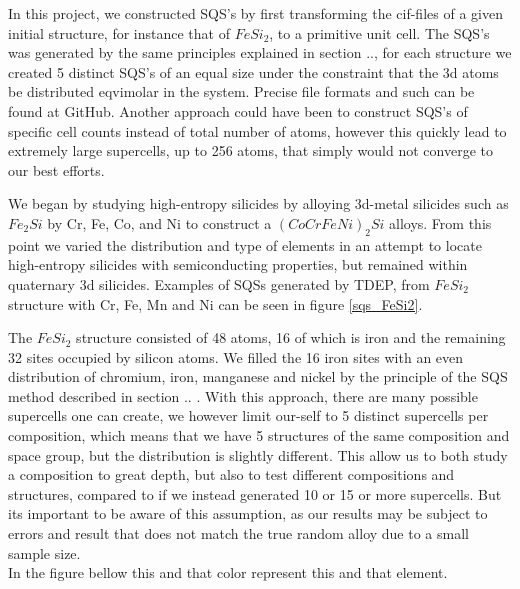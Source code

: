 In this project, we constructed SQS's by first transforming the cif-files of a given initial structure, for instance that of $FeSi_2$, to a primitive unit cell. The SQS's was generated by the same principles explained in section .., for each structure we created 5 distinct SQS's of an equal size under the constraint that the 3d atoms be distributed eqvimolar in the system. Precise file formats and such can be found at GitHub. Another approach could have been to construct SQS's of specific cell counts instead of total number of atoms, however this quickly lead to extremely large supercells, up to 256 atoms, that simply would not converge to our best efforts. 

We began by studying high-entropy silicides by alloying 3d-metal silicides such as $Fe_2Si$ by Cr, Fe, Co, and Ni to construct a $(CoCrFeNi)_2Si$ alloys. From this point we varied the distribution and type of elements in an attempt to locate high-entropy silicides with semiconducting properties, but remained within quaternary 3d silicides. Examples of SQSs generated by TDEP, from $FeSi_2$ structure with Cr, Fe, Mn and Ni can be seen in figure \ref{sqs_FeSi2}.

The $FeSi_2$ structure consisted of 48 atoms, 16 of which is iron and the remaining 32 sites occupied by silicon atoms. We filled the 16 iron sites with an even distribution of chromium, iron, manganese and nickel by the principle of the SQS method described in section .. . With this approach, there are many possible supercells one can create, we however limit our-self to 5 distinct supercells per composition, which means that we have 5 structures of the same composition and space group, but the distribution is slightly different. This allow us to both study a composition to great depth, but also to test different compositions and structures, compared to if we instead generated 10 or 15 or more supercells. But its important to be aware of this assumption, as our results may be subject to errors and result that does not match the true random alloy due to a small sample size. \\

In the figure bellow this and that color represent this and that element. 

